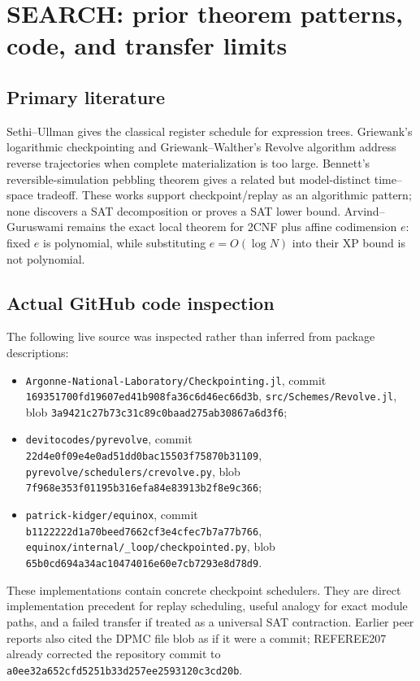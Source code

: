 \documentclass[11pt]{article}
\begin{document}
\section{SEARCH: prior theorem patterns, code, and transfer limits}

\subsection{Primary literature}

Sethi--Ullman gives the classical register schedule for expression trees.  Griewank's logarithmic
checkpointing and Griewank--Walther's Revolve algorithm address reverse trajectories when complete
materialization is too large.  Bennett's reversible-simulation pebbling theorem gives a related but
model-distinct time--space tradeoff.  These works support checkpoint/replay as an algorithmic pattern;
none discovers a SAT decomposition or proves a SAT lower bound.  Arvind--Guruswami remains the exact
local theorem for 2CNF plus affine codimension $e$: fixed $e$ is polynomial, while substituting
$e=O(\log N)$ into their XP bound is not polynomial.

\subsection{Actual GitHub code inspection}

The following live source was inspected rather than inferred from package descriptions:
\begin{itemize}
\item \texttt{Argonne-National-Laboratory/Checkpointing.jl}, commit
\texttt{169351700fd19607ed41b908fa36c6d46ec66d3b},
\texttt{src/Schemes/Revolve.jl}, blob
\texttt{3a9421c27b73c31c89c0baad275ab30867a6d3f6};
\item \texttt{devitocodes/pyrevolve}, commit
\texttt{22d4e0f09e4e0ad51dd0bac15503f75870b31109},
\texttt{pyrevolve/schedulers/crevolve.py}, blob
\texttt{7f968e353f01195b316efa84e83913b2f8e9c366};
\item \texttt{patrick-kidger/equinox}, commit
\texttt{b1122222d1a70beed7662cf3e4cfec7b7a77b766},
\texttt{equinox/internal/\_loop/checkpointed.py}, blob
\texttt{65b0cd694a34ac10474016e60e7cb7293e8d78d9}.
\end{itemize}
These implementations contain concrete checkpoint schedulers.  They are direct implementation
precedent for replay scheduling, useful analogy for exact module paths, and a failed transfer if
treated as a universal SAT contraction.  Earlier peer reports also cited the DPMC file blob as if it
were a commit; REFEREE207 already corrected the repository commit to
\texttt{a0ee32a652cfd5251b33d257ee2593120c3cd20b}.
\end{document}
